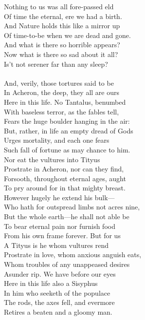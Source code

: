 Nothing to us was all fore-passed eld\\
Of time the eternal, ere we had a birth.\\
And Nature holds this like a mirror up\\
Of time-to-be when we are dead and gone.\\
And what is there so horrible appears?\\
Now what is there so sad about it all?\\
Is't not serener far than any sleep?\\
\\
And, verily, those tortures said to be\\
In Acheron, the deep, they all are ours\\
Here in this life. No Tantalus, benumbed\\
With baseless terror, as the fables tell,\\
Fears the huge boulder hanging in the air:\\
But, rather, in life an empty dread of Gods\\
Urges mortality, and each one fears\\
Such fall of fortune as may chance to him.\\
Nor eat the vultures into Tityus\\
Prostrate in Acheron, nor can they find,\\
Forsooth, throughout eternal ages, aught\\
To pry around for in that mighty breast.\\
However hugely he extend his bulk—\\
Who hath for outspread limbs not acres nine,\\
But the whole earth—he shall not able be\\
To bear eternal pain nor furnish food\\
From his own frame forever. But for us\\
A Tityus is he whom vultures rend\\
Prostrate in love, whom anxious anguish eats,\\
Whom troubles of any unappeased desires\\
Asunder rip. We have before our eyes\\
Here in this life also a Sisyphus\\
In him who seeketh of the populace\\
The rods, the axes fell, and evermore\\
Retires a beaten and a gloomy man.\\
